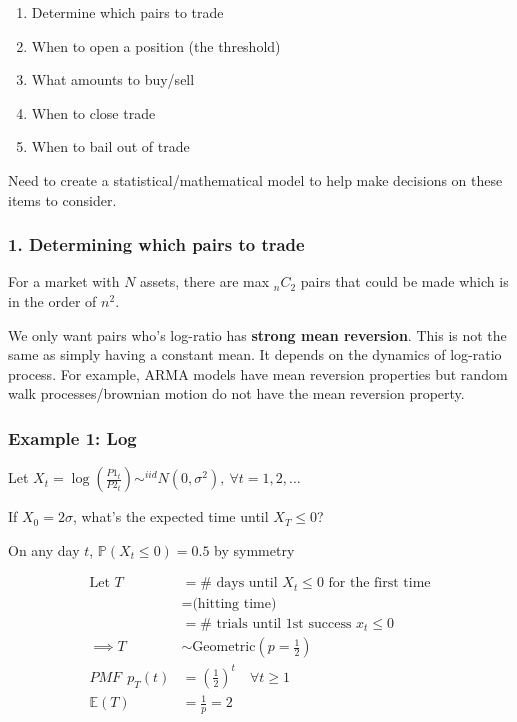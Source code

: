 \documentclass[
  oneside]{book}
\providecommand{\tightlist}{%
  \setlength{\itemsep}{0pt}\setlength{\parskip}{0pt}}
\begin{document}
\begin{enumerate}
\def\labelenumi{\arabic{enumi}.}
\tightlist
\item
  Determine which pairs to trade
\item
  When to open a position (the threshold)
\item
  What amounts to buy/sell
\item
  When to close trade
\item
  When to bail out of trade
\end{enumerate}

Need to create a statistical/mathematical model to help make decisions on these items to consider.

\hypertarget{determining-which-pairs-to-trade}{%
\subsubsection{1. Determining which pairs to trade}\label{determining-which-pairs-to-trade}}

For a market with \(N\) assets, there are max \(_{n}C_{2}\) pairs that could be made which is in the order of \(n^{2}\).

We only want pairs who's log-ratio has \textbf{strong mean reversion}. This is not the same as simply having a constant mean. It depends on the dynamics of log-ratio process. For example, ARMA models have mean reversion properties but random walk processes/brownian motion do not have the mean reversion property.

\hypertarget{example-1-log}{%
\subsubsection{Example 1: Log}\label{example-1-log}}

Let \(X_{t} = \log(\frac{P1_{t}}{P2_{t}}) \sim^{iid} N(0,\sigma^{2}), \ \forall t=1,2,\dots\)

If \(X_{0} = 2\sigma\), what's the expected time until \(X_{T}\leq 0\)?

On any day \(t\), \(\mathbb{P}(X_{t}\leq 0) = 0.5\) by symmetry

\[
\begin{aligned}
\text{Let } T &= \# \text{ days until } X_{t} \leq 0 \text{ for the first time}\\
&= \text{(hitting time)}\\
&= \# \text{ trials until 1st success } x_{t} \leq 0\\
\implies T &\sim \text{Geometric}\left( p=\frac{1}{2} \right)\\
PMF \ \ p_{T}(t) &= \left( \frac{1}{2} \right)^{t} \quad \forall t \geq 1\\
\mathbb{E}(T) &= \frac{1}{p} = 2
\end{aligned}
\]
\end{document}
